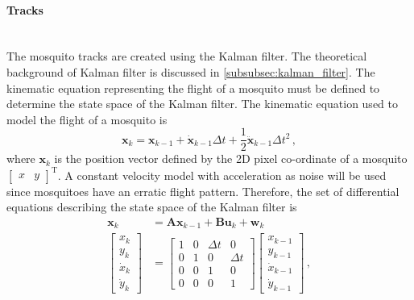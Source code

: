 \paragraph{Tracks}\mbox{}\\
The mosquito tracks are created using the Kalman filter. The theoretical background of Kalman filter is discussed in \autoref{subsubsec:kalman_filter}. The kinematic equation representing the flight of a mosquito must be defined to determine the state space of the Kalman filter. The kinematic equation used to model the flight of a mosquito is
\begin{equation}
    \label{eq:mosquito_kinematic_equation}
    \mathbf{x}_{k} = \mathbf{x}_{k-1} + \mathbf{\dot{x}}_{k-1}\Delta t + \frac{1}{2}\mathbf{\ddot{{x}}}_{k-1}\Delta t^2\,,
\end{equation}
where $\mathbf{x}_{k}$ is the position vector defined by the 2D pixel co-ordinate of a mosquito $\begin{bmatrix} x & y \end{bmatrix}^\mathrm{T}$. A constant velocity model with acceleration as noise will be used since mosquitoes have an erratic flight pattern. Therefore, the set of differential equations describing the state space of the Kalman filter is
\begin{equation}
    \begin{split}
        \mathbf{x}_k
        & = \mathbf{Ax}_{k-1} + \mathbf{Bu}_k + \mathbf{w}_k \\
        \begin{bmatrix}
            x_k       \\
            y_k       \\
            \dot{x}_k \\
            \dot{y}_k
        \end{bmatrix}
        & =
        \begin{bmatrix}
            1 & 0 & \Delta t & 0        \\
            0 & 1 & 0        & \Delta t \\
            0 & 0 & 1        & 0        \\
            0 & 0 & 0        & 1
        \end{bmatrix}
        \begin{bmatrix}
            x_{k-1}       \\
            y_{k-1}       \\
            \dot{x}_{k-1} \\
            \dot{y}_{k-1}
        \end{bmatrix}\,,
    \end{split}
\end{equation}
